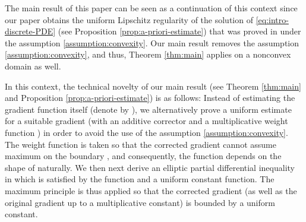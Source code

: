\documentclass[11pt]{article}
\makeatletter
\numberwithin{equation}{section}
\newtheorem{corollary}[theorem]{Corollary}
\newcounter{mathrecordid}
\newcommand{\mathboxbegin}[1]{%
  \stepcounter{mathrecordid}%
  \immediate\write\mathrecords{\themathrecordid,#1}%
  \special{pdf:bann << /Type /Annot /Subtype /Link /Border [0 0 0]
    /MathBoxID \themathrecordid /F 2
    /A << /S /URI /URI (urn:mathbox:\themathrecordid) >> >>}}
\newcommand{\mathboxinlineplain}[1]{$#1$}
\newcommand{\mathboxinline}[1]{%
  $\mathboxbegin{inline}#1\special{pdf:eann}$}
\newcommand{\recordmath}{%
  \ifmeasuring@\expandafter\mathboxinlineplain
  \else\expandafter\mathboxinline\fi}
\makeatother
\begin{document}
The main result of this paper can be seen as a continuation of this context since our paper obtains the uniform Lipschitz regularity of the solution \recordmath{w} of \eqref{eq:intro-discrete-PDE} (see Proposition \ref{prop:a-priori-estimate}) that was proved in \cite{EG25} under the assumption \eqref{assumption:convexity}. Our main result removes the assumption \eqref{assumption:convexity}, and thus, Theorem \ref{thm:main} applies on a nonconvex domain as well.



In this context, the technical novelty of our main result (see Theorem \ref{thm:main} and Proposition \ref{prop:a-priori-estimate}) is as follows: Instead of estimating the gradient function itself (denote by \recordmath{\phi}), we alternatively prove a uniform estimate for a suitable gradient \recordmath{z:=\rho(\phi + \psi)} (with an additive corrector \recordmath{\psi} and a multiplicative weight function \recordmath{\rho}) in order to avoid the use of the assumption \eqref{assumption:convexity}. The weight function \recordmath{\rho} is taken so that the corrected gradient \recordmath{z} cannot assume maximum on the boundary \recordmath{\partial\Omega}, and consequently, the function \recordmath{\rho} depends on the shape of \recordmath{\partial\Omega} naturally. We then next derive an elliptic partial differential inequality in \recordmath{\Omega} which is satisfied by the function \recordmath{z} and a uniform constant function. The maximum principle is thus applied so that the corrected gradient \recordmath{z} (as well as the original gradient \recordmath{\phi} up to a multiplicative constant) is bounded by a uniform constant.





\end{document}
